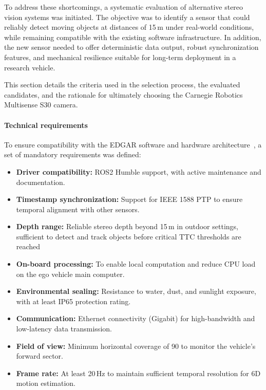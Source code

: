 To address these shortcomings, a systematic evaluation of alternative stereo vision 
systems was initiated. The objective was to identify a sensor that could reliably 
detect moving objects at distances of 15\,m under real-world conditions, while 
remaining compatible with the existing software infrastructure. In addition, the 
new sensor needed to offer deterministic data output, robust synchronization 
features, and mechanical resilience suitable for long-term deployment in a 
research vehicle.

This section details the criteria used in the selection process, the evaluated 
candidates, and the rationale for ultimately choosing the Carnegie Robotics 
Multisense S30 camera.

\paragraph{Technical requirements}

To ensure compatibility with the EDGAR software and hardware architecture~\cite{edgar_hardware}, 
a set of mandatory requirements was defined:

\begin{itemize}
  \item \textbf{Driver compatibility:} ROS2 Humble support, 
        with active maintenance and documentation.
  \item \textbf{Timestamp synchronization:} Support for IEEE 1588 PTP to ensure 
        temporal alignment with other sensors.
  \item \textbf{Depth range:} Reliable stereo depth beyond 15\,m in outdoor settings, 
        sufficient to detect and track objects before critical TTC thresholds are reached
  \item \textbf{On-board processing:} To enable local computation and reduce CPU load 
        on the ego vehicle main computer.
  \item \textbf{Environmental sealing:} Resistance to water, dust, and sunlight exposure, 
        with at least IP65 protection rating.
  \item \textbf{Communication:} Ethernet connectivity (Gigabit) for high-bandwidth 
        and low-latency data transmission.
  \item \textbf{Field of view:} Minimum horizontal coverage of 90  to monitor 
        the vehicle’s forward sector. 
  \item \textbf{Frame rate:} At least 20\,Hz to maintain sufficient temporal resolution 
        for 6D motion estimation.
\end{itemize}

